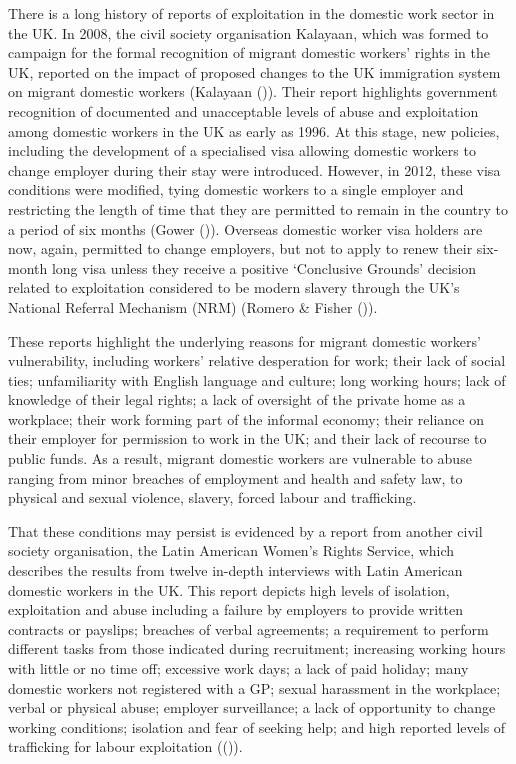 \documentclass[
  12pt,
]{article}
\theoremstyle{plain}
\theoremstyle{definition}
\begin{document}
There is a long history of reports of exploitation in the domestic work
sector in the UK. In 2008, the civil society organisation Kalayaan,
which was formed to campaign for the formal recognition of migrant
domestic workers' rights in the UK, reported on the impact of proposed
changes to the UK immigration system on migrant domestic workers
(Kalayaan ()). Their report
highlights government recognition of documented and unacceptable levels
of abuse and exploitation among domestic workers in the UK as early as
1996. At this stage, new policies, including the development of a
specialised visa allowing domestic workers to change employer during
their stay were introduced. However, in 2012, these visa conditions were
modified, tying domestic workers to a single employer and restricting
the length of time that they are permitted to remain in the country to a
period of six months (Gower ()).
Overseas domestic worker visa holders are now, again, permitted to
change employers, but not to apply to renew their six-month long visa
unless they receive a positive `Conclusive Grounds' decision related to
exploitation considered to be modern slavery through the UK's National
Referral Mechanism (NRM) (Romero \& Fisher
()).

These reports highlight the underlying reasons for migrant domestic
workers' vulnerability, including workers' relative desperation for
work; their lack of social ties; unfamiliarity with English language and
culture; long working hours; lack of knowledge of their legal rights; a
lack of oversight of the private home as a workplace; their work forming
part of the informal economy; their reliance on their employer for
permission to work in the UK; and their lack of recourse to public
funds. As a result, migrant domestic workers are vulnerable to abuse
ranging from minor breaches of employment and health and safety law, to
physical and sexual violence, slavery, forced labour and trafficking.

That these conditions may persist is evidenced by a report from another
civil society organisation, the Latin American Women's Rights Service,
which describes the results from twelve in-depth interviews with Latin
American domestic workers in the UK. This report depicts high levels of
isolation, exploitation and abuse including a failure by employers to
provide written contracts or payslips; breaches of verbal agreements; a
requirement to perform different tasks from those indicated during
recruitment; increasing working hours with little or no time off;
excessive work days; a lack of paid holiday; many domestic workers not
registered with a GP; sexual harassment in the workplace; verbal or
physical abuse; employer surveillance; a lack of opportunity to change
working conditions; isolation and fear of seeking help; and high
reported levels of trafficking for labour exploitation
(()).
\end{document}
